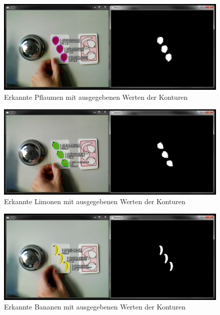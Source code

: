 \begin{figure}[H]
    \centering
    \includegraphics[width=\textwidth]{Abbildungen/Pflaumen03}
    \caption[]{Erkannte Pflaumen mit ausgegebenen Werten der Konturen}
    \label{fig:Pflaumen03}
\end{figure}
\begin{figure}[H]
    \centering
    \includegraphics[width=\textwidth]{Abbildungen/Limetten03}
    \caption[]{Erkannte Limonen mit ausgegebenen Werten der Konturen}
    \label{fig:Limetten03}
\end{figure}
\begin{figure}[H]
    \centering
    \includegraphics[width=\textwidth]{Abbildungen/Bananen03}
    \caption[]{Erkannte Bananen mit ausgegebenen Werten der Konturen}
    \label{fig:Bananen03}
\end{figure}

